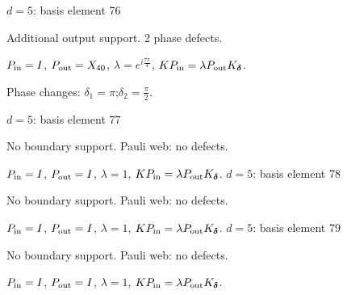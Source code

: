 {\Large $d=5$: basis element 76}\par
Additional output support. 2 phase defects.
\begin{center}
\end{center}
\vspace{-1mm}
$P_{\rm in}=I$, \quad $P_{\rm out}=X_{40}$, \quad $\lambda=e^{i\frac{7\pi}{4}}$, \qquad $K P_{\rm in}=\lambda P_{\rm out}K_{\boldsymbol\delta}$.
\par\smallskip\begin{minipage}{.98\linewidth}\small Phase changes: $\delta_{1}=\pi$;\quad $\delta_{2}=\frac{\pi}{2}$.\end{minipage}
\vfill
{\footnotesize\texttt{}}
\newpage
{}
{\Large $d=5$: basis element 77}\par
No boundary support. Pauli web: no defects.
\begin{center}
\end{center}
\vspace{-1mm}
$P_{\rm in}=I$, \quad $P_{\rm out}=I$, \quad $\lambda=1$, \qquad $K P_{\rm in}=\lambda P_{\rm out}K_{\boldsymbol\delta}$.
\vfill
{\footnotesize\texttt{}}
\newpage
{}
{\Large $d=5$: basis element 78}\par
No boundary support. Pauli web: no defects.
\begin{center}
\end{center}
\vspace{-1mm}
$P_{\rm in}=I$, \quad $P_{\rm out}=I$, \quad $\lambda=1$, \qquad $K P_{\rm in}=\lambda P_{\rm out}K_{\boldsymbol\delta}$.
\vfill
{\footnotesize\texttt{}}
\newpage
{}
{\Large $d=5$: basis element 79}\par
No boundary support. Pauli web: no defects.
\begin{center}
\end{center}
\vspace{-1mm}
$P_{\rm in}=I$, \quad $P_{\rm out}=I$, \quad $\lambda=1$, \qquad $K P_{\rm in}=\lambda P_{\rm out}K_{\boldsymbol\delta}$.
\vfill
{\footnotesize\texttt{}}
\newpage
{}
